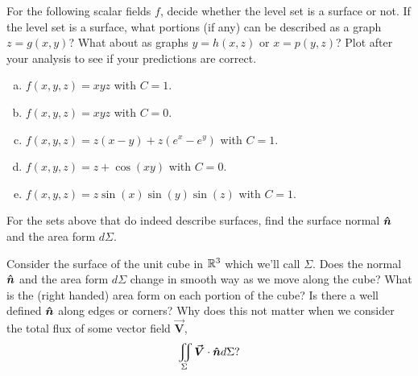 \documentclass[12pt]{article} %
\newcommand{\vecfieldV}{\boldsymbol{\vec{V}}}
\begin{document}
\newpage
\begin{problem}
    For the following scalar fields $f$, decide whether the level set is a surface or not. If the level set is a surface, what portions (if any) can be described as a graph $z=g(x,y)$?  What about as graphs $y=h(x,z)$ or $x=p(y,z)$? Plot after your analysis to see if your predictions are correct.
    \begin{enumerate}[(a)]
        \item $f(x,y,z)=xyz$ with $C=1$.
        \item $f(x,y,z)=xyz$ with $C=0$.
        \item $f(x,y,z) = z(x-y)+z(e^x-e^y)$ with $C=1$.
        \item $f(x,y,z) = z + \cos(xy)$ with $C=0$.
        \item $f(x,y,z) = z\sin(x)\sin(y)\sin(z)$ with $C=1$.
    \end{enumerate}
\end{problem}
\begin{solution}

\end{solution}

\newpage
\begin{problem}
    For the sets above that do indeed describe surfaces, find the surface normal $\boldsymbol{\hat{n}}$ and the area form $d\Sigma$.
\end{problem}
\begin{solution}

\end{solution}

\newpage
\begin{problem}
    Consider the surface of the unit cube in $\mathbb{R}^3$ which we'll call $\Sigma$.  Does the normal $\boldsymbol{\hat{n}}$ and the area form $d\Sigma$ change in smooth way as we move along the cube?  What is the (right handed) area form on each portion of the cube? Is there a well defined $\boldsymbol{\hat{n}}$ along edges or corners? Why does this not matter when we consider the total flux of some vector field $\vecfieldV$,
    \[
        \iint_\Sigma \vecfieldV \cdot \unitvec d\Sigma?
    \]
\end{problem}
\begin{solution}

\end{solution}
\end{document}
